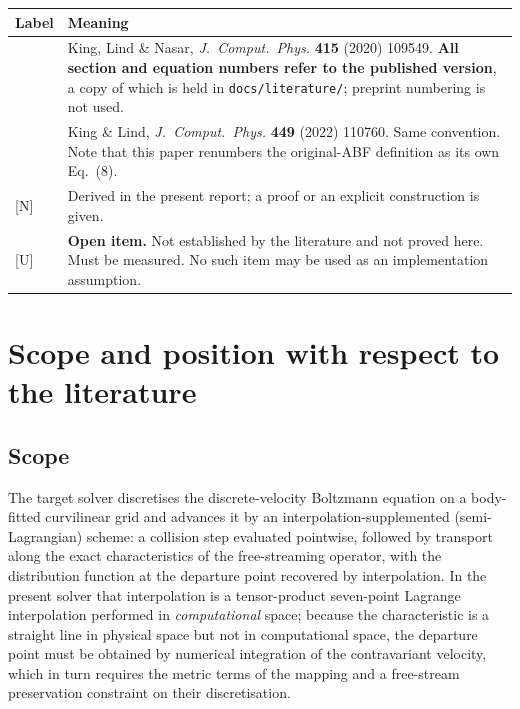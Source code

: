 \documentclass[11pt,a4paper]{article}
\newcommand{\New}{\textcolor{blue!60!black}{\textsf{[N]}}}
\newcommand{\TBD}{\textcolor{red!70!black}{\textsf{[U]}}}
\begin{document}
\medskip
\begin{center}
\begin{tabularx}{\textwidth}{lX}
\toprule
Label & Meaning \\
\midrule
\cite{KLN2020} & King, Lind \& Nasar, \emph{J.\ Comput.\ Phys.} \textbf{415} (2020)
109549. \textbf{All section and equation numbers refer to the published version}, a copy
of which is held in \texttt{docs/literature/}; preprint numbering is not used. \\
\cite{KL2021} & King \& Lind, \emph{J.\ Comput.\ Phys.} \textbf{449} (2022) 110760.
Same convention. Note that this paper renumbers the original-ABF definition
\cite[Eq.~(19)]{KLN2020} as its own Eq.~(8). \\
\New & Derived in the present report; a proof or an explicit construction is given. \\
\TBD & \textbf{Open item.} Not established by the literature and not proved here.
Must be measured. No such item may be used as an implementation assumption. \\
\bottomrule
\end{tabularx}
\end{center}

\tableofcontents
\newpage

\section{Scope and position with respect to the literature}

\subsection{Scope}

The target solver discretises the discrete-velocity Boltzmann equation on a
body-fitted curvilinear grid and advances it by an interpolation-supplemented
(semi-Lagrangian) scheme: a collision step evaluated pointwise, followed by transport
along the exact characteristics of the free-streaming operator, with the distribution
function at the departure point recovered by interpolation. In the present solver
that interpolation is a tensor-product seven-point Lagrange interpolation performed in
\emph{computational} space; because the characteristic is a straight line in physical
space but not in computational space, the departure point must be obtained by
numerical integration of the contravariant velocity, which in turn requires the metric
terms of the mapping and a free-stream preservation constraint on their discretisation.
\end{document}
